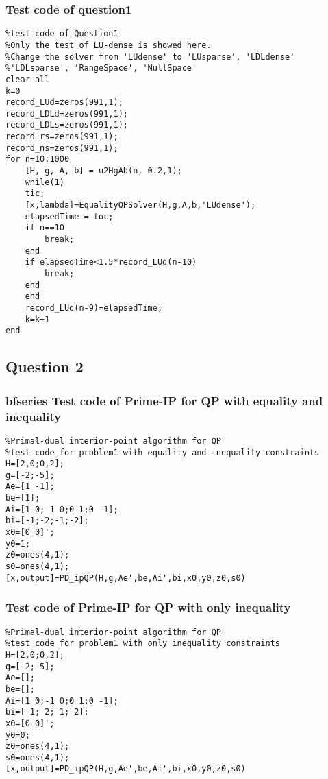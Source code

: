\subsubsection{\bfseries Test code of question1 }
\label{6.1.3}
{\setmainfont{Courier New Bold} \scriptsize         
\begin{lstlisting}
%test code of Question1 
%Only the test of LU-dense is showed here.
%Change the solver from 'LUdense' to 'LUsparse', 'LDLdense'
%'LDLsparse', 'RangeSpace', 'NullSpace'
clear all
k=0
record_LUd=zeros(991,1);
record_LDLd=zeros(991,1);
record_LDLs=zeros(991,1);
record_rs=zeros(991,1);
record_ns=zeros(991,1);
for n=10:1000
    [H, g, A, b] = u2HgAb(n, 0.2,1);
    while(1)
    tic;
    [x,lambda]=EqualityQPSolver(H,g,A,b,'LUdense');
    elapsedTime = toc;
    if n==10
        break;
    end
    if elapsedTime<1.5*record_LUd(n-10)
        break;
    end
    end
    record_LUd(n-9)=elapsedTime;
    k=k+1
end
\end{lstlisting}}
\subsection{\bfseries Question 2 }

\subsubsection{bfseries Test code of Prime-IP for QP with equality and inequality}
\label{6.2.1}
{\setmainfont{Courier New Bold} \scriptsize         
\begin{lstlisting}
%Primal-dual interior-point algorithm for QP 
%test code for problem1 with equality and inequality constraints
H=[2,0;0,2];
g=[-2;-5];
Ae=[1 -1];
be=[1];
Ai=[1 0;-1 0;0 1;0 -1];
bi=[-1;-2;-1;-2];
x0=[0 0]';
y0=1;
z0=ones(4,1);
s0=ones(4,1);
[x,output]=PD_ipQP(H,g,Ae',be,Ai',bi,x0,y0,z0,s0)
\end{lstlisting}}
\subsubsection{\bfseries Test code of Prime-IP for QP with only inequality}
\label{6.2.2}
{\setmainfont{Courier New Bold} \scriptsize         
\begin{lstlisting}
%Primal-dual interior-point algorithm for QP 
%test code for problem1 with only inequality constraints
H=[2,0;0,2];
g=[-2;-5];
Ae=[];
be=[];
Ai=[1 0;-1 0;0 1;0 -1];
bi=[-1;-2;-1;-2];
x0=[0 0]';
y0=0;
z0=ones(4,1);
s0=ones(4,1);
[x,output]=PD_ipQP(H,g,Ae',be,Ai',bi,x0,y0,z0,s0)
\end{lstlisting}}

